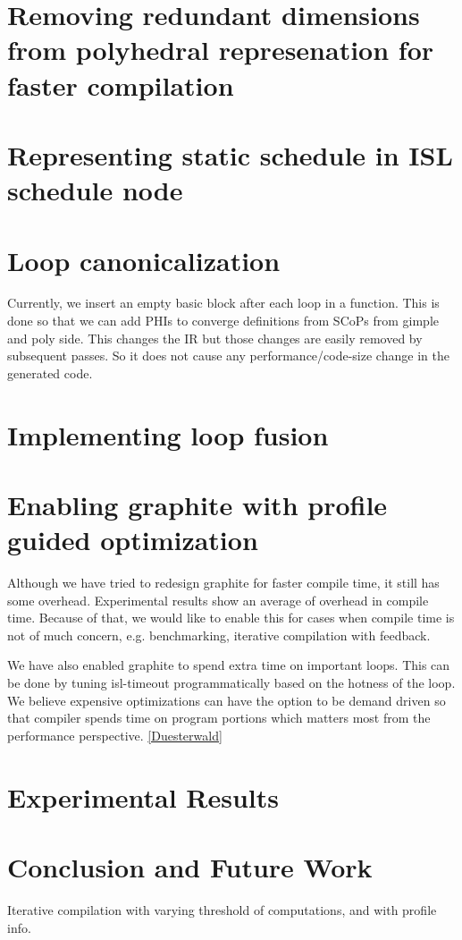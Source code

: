 \section{Removing redundant dimensions from polyhedral represenation for faster compilation}

\section{Representing static schedule in ISL schedule node}

\section{Loop canonicalization}
Currently, we insert an empty basic block after each loop in a function. This is done so that
we can add PHIs to converge definitions from SCoPs from gimple and poly side. This changes
the IR but those changes are easily removed by subsequent passes. So it does not cause any
performance/code-size change in the generated code.


\section{Implementing loop fusion}

\section{Enabling graphite with profile guided optimization}
Although we have tried to redesign graphite for faster compile time, it still has some overhead.
Experimental results show an average of {} overhead in compile time.
Because of that, we would like to enable this for cases when compile time is not of much concern,
e.g. benchmarking, iterative compilation with feedback.

We have also enabled graphite to spend extra time on important loops. This can be done by tuning
isl-timeout programmatically based on the hotness of the loop. We believe expensive optimizations
can have the option to be demand driven so that compiler spends time on program portions which matters
most from the performance perspective. \ref{Duesterwald}


\section{Experimental Results}

\section{Conclusion and Future Work}
Iterative compilation with varying threshold of computations, and with profile info.


